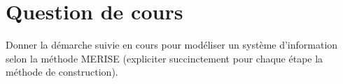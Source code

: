 \section*{Question de cours}

Donner la démarche suivie en cours pour modéliser un système d'information selon la méthode MERISE (expliciter succinctement pour chaque étape la méthode de construction).
